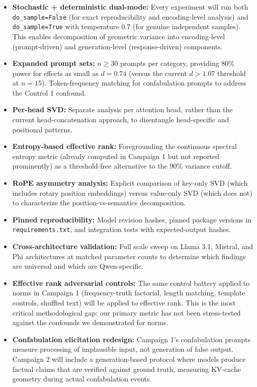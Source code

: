 \documentclass[11pt,a4paper]{article}
\begin{document}
\begin{itemize}[leftmargin=*]
    \item \textbf{Stochastic + deterministic dual-mode:} Every experiment will run both \texttt{do\_sample=False} (for exact reproducibility and encoding-level analysis) and \texttt{do\_sample=True} with temperature 0.7 (for genuine independent samples). This enables decomposition of geometric variance into encoding-level (prompt-driven) and generation-level (response-driven) components.
    \item \textbf{Expanded prompt sets:} $n \geq 30$ prompts per category, providing 80\% power for effects as small as $d = 0.74$ (versus the current $d > 1.07$ threshold at $n = 15$). Token-frequency matching for confabulation prompts to address the Control 1 confound.
    \item \textbf{Per-head SVD:} Separate analysis per attention head, rather than the current head-concatenation approach, to disentangle head-specific and positional patterns.
    \item \textbf{Entropy-based effective rank:} Foregrounding the continuous spectral entropy metric (already computed in Campaign 1 but not reported prominently) as a threshold-free alternative to the 90\% variance cutoff.
    \item \textbf{RoPE asymmetry analysis:} Explicit comparison of key-only SVD (which includes rotary position embeddings) versus value-only SVD (which does not) to characterize the position-vs-semantics decomposition.
    \item \textbf{Pinned reproducibility:} Model revision hashes, pinned package versions in \texttt{requirements.txt}, and integration tests with expected-output hashes.
    \item \textbf{Cross-architecture validation:} Full scale sweep on Llama 3.1, Mistral, and Phi architectures at matched parameter counts to determine which findings are universal and which are Qwen-specific.
    \item \textbf{Effective rank adversarial controls:} The same control battery applied to norms in Campaign 1 (frequency-truth factorial, length matching, template controls, shuffled text) will be applied to effective rank. This is the most critical methodological gap: our primary metric has not been stress-tested against the confounds we demonstrated for norms.
    \item \textbf{Confabulation elicitation redesign:} Campaign 1's confabulation prompts measure processing of implausible input, not generation of false output. Campaign 2 will include a generation-based protocol where models produce factual claims that are verified against ground truth, measuring KV-cache geometry during actual confabulation events.

\end{itemize}
\end{document}
